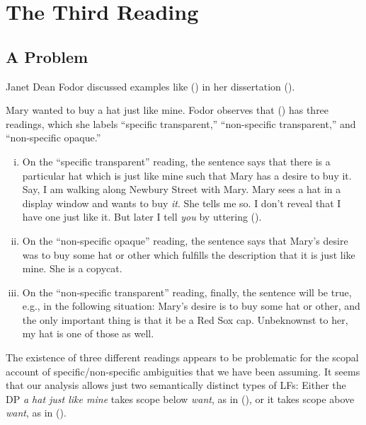 \chapter{The Third Reading}\label{cha:the_third_reading} 


\minitoc

\section{A Problem}

Janet Dean Fodor discussed examples like (\nextx) in her dissertation (\citeyear{fodor-diss}).

\ex Mary wanted to buy a hat just like mine. \xe
%
Fodor observes that (\lastx) has three readings, which she labels ``specific transparent,'' ``non-specific transparent,'' and ``non-specific opaque.''

\begin{enumerate}[(i)] 
	\item On the ``specific transparent'' reading, the sentence says that there is a particular hat which is just like mine such that Mary has a desire to buy it. Say, I am walking along Newbury Street with Mary. Mary sees a hat in a display window and wants to buy \emph{it}. She tells me so. I don't reveal that I have one just like it. But later I tell \emph{you} by uttering (\lastx). 
	\item On the ``non-specific opaque'' reading, the sentence says that Mary's desire was to buy some hat or other which fulfills the description that it is just like mine. She is a copycat. 
	\item On the ``non-specific transparent'' reading, finally, the sentence will be true, e.g., in the following situation: Mary's desire is to buy some hat or other, and the only important thing is that it be a Red Sox cap. Unbeknownst to her, my hat is one of those as well. 
\end{enumerate}
%
The existence of three different readings appears to be problematic for the scopal account of specific/non-specific ambiguities that we have been assuming. It seems that our analysis allows just two semantically distinct types of LFs: Either the DP \emph{a hat just like mine} takes scope below \emph{want}, as in (\nextx), or it takes scope above \emph{want}, as in (\anextx).

